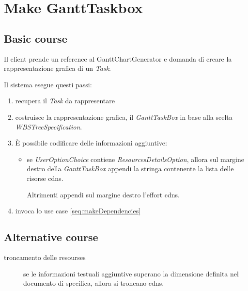 \section{Make GanttTaskbox}
\label{seq:makeGanttTaskbox}
\subsection{Basic course}
Il client prende un reference al GanttChartGenerator e domanda di creare la
rappresentazione grafica di un \emph{Task}. 

Il sistema esegue questi passi:
\begin{enumerate}
  \item recupera il \emph{Task} da rappresentare
  \item costruisce la rappresentazione grafica, il \emph{GanttTaskBox}
    in base alla scelta \emph{WBSTreeSpecification}.
  \item \`E possibile codificare delle informazioni aggiuntive:
    \begin{itemize}
   	  \item se \emph{UserOptionChoice} contiene \emph{ResourcesDetailsOption},
    	allora sul margine destro della \emph{GanttTaskBox} appendi la stringa
    	contenente la lista delle risorse cdns.
    	
    	Altrimenti appendi sul margine destro l'effort cdns.
    \end{itemize}
  \item invoca lo use case \ref{seq:makeDependencies}
    
\end{enumerate}

\subsection{Alternative course}
\begin{description}
\item[troncamento delle resourses] se le informazioni testuali aggiuntive
superano la dimensione definita nel documento di specifica, allora si troncano
cdns.

\end{description}